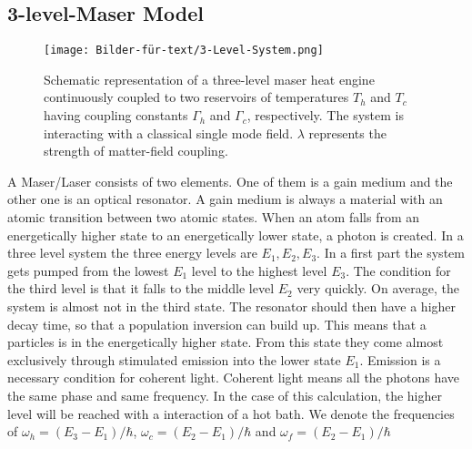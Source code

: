 \documentclass[12pt,a4paper]{article}
\begin{document}
\subsection{3-level-Maser Model}
\begin{figure}[h!] 
\texttt{[image: Bilder-für-text/3-Level-System.png]}
\caption{Schematic representation of a three-level maser heat engine
continuously coupled to two reservoirs of temperatures $T_h$ and
$T_c$ having coupling constants $\Gamma_h$ and $\Gamma_c$, respectively. The
system is interacting with a classical single mode field. $\lambda$
represents the strength of matter-field coupling.}
\end{figure}
A Maser/Laser consists of two elements. One of them is a gain medium and the other one is an optical resonator. A gain medium is always a material with an atomic transition between two atomic states. When an atom falls from an energetically higher state to an energetically lower state, a photon is created.
In a three level system the three energy levels are $E_1,E_2,E_3$. In a first part the system gets pumped from the lowest $E_1$ level to the highest level $ E_3$. The condition for the third level is that it falls to the middle level $ E_2$ very quickly. On average, the system is almost not in the third state. The resonator should then have a higher decay time, so that a population inversion can build up. This means that a particles is in the energetically higher state. From this state they come almost exclusively through stimulated emission into the lower state $ E_1$. 
Emission is a necessary condition for coherent light. Coherent light means all the photons have the same phase and same frequency. \cite{Li2017}
In the case of this calculation, the higher level will be reached with a interaction of a hot bath.  
We denote the frequencies of $\omega_h=(E_3-E_1)/\hbar$, $\omega_c=(E_2-E_1)/\hbar$ and $\omega_f=(E_2-E_1)/\hbar$
\end{document}
